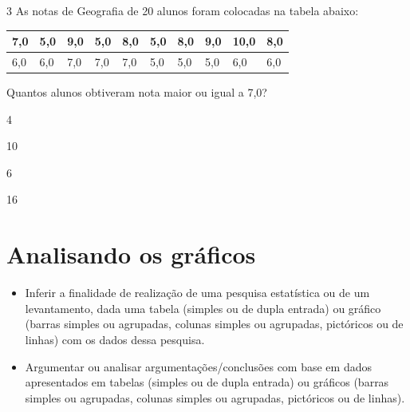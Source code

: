 \num{3} As notas de Geografia de 20 alunos foram colocadas na tabela
abaixo:

\begin{longtable}[]{@{}llllllllll@{}}
\toprule
7,0 & 5,0 & 9,0 & 5,0 & 8,0 & 5,0 & 8,0 & 9,0 & 10,0 &
8,0\tabularnewline
\midrule
\endhead
6,0 & 6,0 & 7,0 & 7,0 & 7,0 & 5,0 & 5,0 & 5,0 & 6,0 & 6,0\tabularnewline
\bottomrule
\end{longtable}

Quantos alunos obtiveram nota maior ou igual a 7,0?

\begin{minipage}{.5\textwidth}
\begin{escolha}
\item
  4
\item
  10
\item
  6
\item
  16
\end{escolha}
\end{minipage}

\chapter{Analisando os gráficos}


\begin{itemize}
\item Inferir a finalidade de realização de uma pesquisa estatística ou de
um levantamento, dada uma tabela (simples ou de dupla entrada) ou
gráfico (barras simples ou agrupadas, colunas simples ou agrupadas,
pictóricos ou de linhas) com os dados dessa pesquisa.

\item Argumentar ou analisar argumentações/conclusões com base em dados
apresentados em tabelas (simples ou de dupla entrada) ou gráficos
(barras simples ou agrupadas, colunas simples ou agrupadas, pictóricos
ou de linhas).
\end{itemize}

